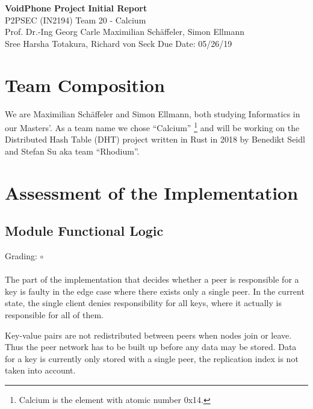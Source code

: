 \documentclass[a4paper, 11pt]{article}
\begin{document}
\noindent
\large\textbf{VoidPhone Project} \hfill \textbf{Initial Report} \\
\normalsize P2PSEC (IN2194)  \hfill Team 20 - Calcium\\
Prof. Dr.-Ing Georg Carle \hfill Maximilian Schäffeler, Simon Ellmann \\
Sree Harsha Totakura, Richard von Seck \hfill Due Date: 05/26/19

%

\section*{Team Composition}
We are Maximilian Schäffeler and Simon Ellmann, both studying Informatics in our Masters'.
As a team name we chose ``Calcium'' \footnote{Calcium is the element with atomic number 0x14.} and will be working on the Distributed Hash Table (DHT) project written in Rust in 2018 by Benedikt Seidl and Stefan Su aka team ``Rhodium''.


\section*{Assessment of the Implementation}
\subsection*{Module Functional Logic}
Grading: $\circ$\\
\\
The part of the implementation that decides whether a peer is responsible for a key is faulty in the edge case where there exists only a single peer. 
In the current state, the single client denies responsibility for all keys, where it actually is responsible for all of them.

Key-value pairs are not redistributed between peers when nodes join or leave. Thus the peer network has to be built up before any data may be stored.
Data for a key is currently only stored with a single peer, the replication index is not taken into account.
\end{document}
